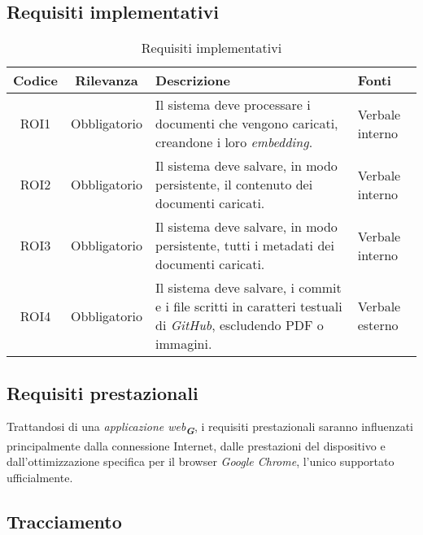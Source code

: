 \subsection{Requisiti implementativi}
\label{sec:Requisiti_implementativi}
\begin{table}[h!]
    \centering
    \renewcommand{\arraystretch}{1.6} %
    \begin{tabularx}{\textwidth}{|>{\centering\arraybackslash}c|>{\centering\arraybackslash}c|>{\centering\arraybackslash}X|>{\centering\arraybackslash}p{3cm}|} \hline
    \rowcolor[HTML]{FFD700} 
    \textbf{Codice} & \textbf{Rilevanza} & \textbf{Descrizione} & \textbf{Fonti} \\ \hline
    ROI1 & Obbligatorio & Il sistema deve processare i documenti che vengono caricati, creandone i loro \emph{embedding}. & Verbale interno\\ \hline
    ROI2 & Obbligatorio & Il sistema deve salvare, in modo persistente, il contenuto dei documenti caricati. & Verbale interno\\ \hline
    ROI3 & Obbligatorio & Il sistema deve salvare, in modo persistente, tutti i metadati dei documenti caricati. & Verbale interno\\ \hline
    ROI4 & Obbligatorio & Il sistema deve salvare, i commit e i file scritti in caratteri testuali di \emph{GitHub}, escludendo PDF o immagini. & Verbale esterno\\ \hline
    \end{tabularx}
    \caption{Requisiti implementativi}
    \label{tab:Requisiti_implementativi}
\end{table}

\subsection{Requisiti prestazionali}
\label{sec:req_prestazionali}
Trattandosi di una \emph{applicazione web}\textsubscript{\textit{\textbf{G}}}, i requisiti prestazionali saranno influenzati principalmente dalla connessione Internet, 
dalle prestazioni del dispositivo e dall'ottimizzazione specifica per il browser \emph{Google Chrome}, l'unico supportato ufficialmente.

\newpage
\subsection{Tracciamento}
